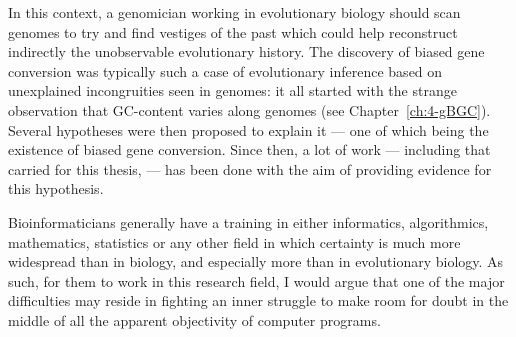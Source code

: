 In this context, a genomician working in evolutionary biology should scan genomes to try and find vestiges of the past which could help reconstruct indirectly the unobservable evolutionary history.
The discovery of biased gene conversion was typically such a case of evolutionary inference based on unexplained incongruities seen in genomes:
it all started with the strange observation that GC-content varies along genomes (see Chapter~\ref{ch:4-gBGC}).
Several hypotheses were then proposed to explain it — one of which being the existence of biased gene conversion.
Since then, a lot of work — including that carried for this thesis, — has been done with the aim of providing evidence for this hypothesis.

Bioinformaticians generally have a training in either informatics, algorithmics, mathematics, statistics or any other field in which certainty is much more widespread than in biology, and especially more than in evolutionary biology.
As such, for them to work in this research field, I would argue that one of the major difficulties may reside in fighting an inner struggle to make room for doubt in the middle of all the apparent objectivity of computer programs.\\





%



